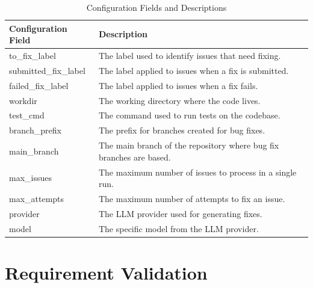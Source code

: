 \renewcommand{\arraystretch}{1.5}
\begin{longtable}{@{\extracolsep{\fill}} p{3.5cm} | p{11cm} @{}}
    \caption{Configuration Fields and Descriptions} \label{table:configuration}                        \\
    \toprule
    \textbf{Configuration Field} & \textbf{Description}                                                \\
    \midrule
    \endfirsthead

    \bottomrule
    \endfoot

    to\_fix\_label               & The label used to identify issues that need fixing.                 \\ \hline
    submitted\_fix\_label        & The label applied to issues when a fix is submitted.                \\ \hline
    failed\_fix\_label           & The label applied to issues when a fix fails.                       \\ \hline
    workdir                      & The working directory where the code lives.                         \\ \hline
    test\_cmd                    & The command used to run tests on the codebase.                      \\ \hline
    branch\_prefix               & The prefix for branches created for bug fixes.                      \\ \hline
    main\_branch                 & The main branch of the repository where bug fix branches are based. \\ \hline
    max\_issues                  & The maximum number of issues to process in a single run.            \\ \hline
    max\_attempts                & The maximum number of attempts to fix an issue.                     \\ \hline
    provider                     & The \ac{LLM} provider used for generating fixes.                    \\ \hline
    model                        & The specific model from the \ac{LLM} provider.                      \\
\end{longtable}



\section{Requirement Validation}

